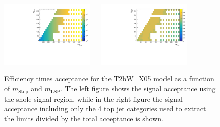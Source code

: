 \begin{figure}[h!]
  \begin{center}
    \includegraphics[width=0.4\textwidth]{figures/jetRanking/T2bW_X05/eff/T2bW_X05_merging_9_cats.pdf} ~~
    \includegraphics[width=0.4\textwidth]{figures/susyResults/T2bW_X05_doubleRatioAcceptance.pdf} \\
    \caption{
      Efficiency times acceptance for the T2bW\_X05 model as a function of $m_{\mathrm{Stop}}$ and $m_{\mathrm{LSP}}$.
      The left figure shows the signal acceptance using the shole signal region, 
      while in the right figure the signal acceptance including only the 4 top jet categories used to extract the limits divided by the total acceptance is shown.
    }
    \label{fig:sig-eff-T2bW_X05}
  \end{center}
\end{figure}

